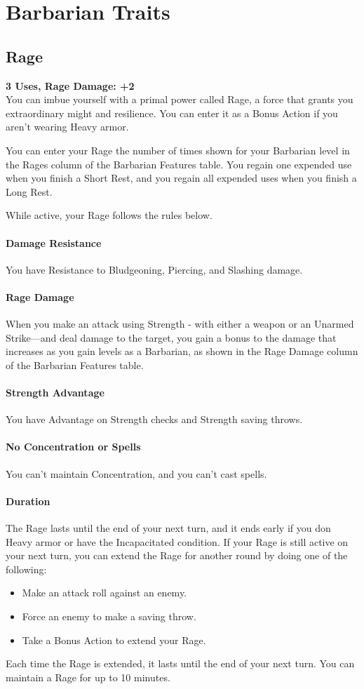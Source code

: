 \documentclass[letterpaper,openany,oneside,twocolumn]{book}
\begin{document}
\section*{Barbarian Traits}
\subsection*{Rage}
\newcommand{\RageModifier}{+2}\textbf{3 Uses, Rage Damage: \RageModifier}\\
You can imbue yourself with a primal power called Rage, a force that grants you extraordinary might and resilience. You can enter it as a Bonus Action if you aren't wearing Heavy armor.

You can enter your Rage the number of times shown for your Barbarian level in the Rages column of the Barbarian Features table. You regain one expended use when you finish a Short Rest, and you regain all expended uses when you finish a Long Rest.

While active, your Rage follows the rules below.

\paragraph*{Damage Resistance} You have Resistance to Bludgeoning, Piercing, and Slashing damage.

\paragraph*{Rage Damage} When you make an attack using Strength - with either a weapon or an Unarmed Strike—and deal damage to the target, you gain a bonus to the damage that increases as you gain levels as a Barbarian, as shown in the Rage Damage column of the Barbarian Features table.

\paragraph*{Strength Advantage} You have Advantage on Strength checks and Strength saving throws.

\paragraph*{No Concentration or Spells} You can't maintain Concentration, and you can't cast spells.

\paragraph*{Duration} The Rage lasts until the end of your next turn, and it ends early if you don Heavy armor or have the Incapacitated condition. If your Rage is still active on your next turn, you can extend the Rage for another round by doing one of the following:
\begin{itemize}
	\item Make an attack roll against an enemy.
	\item Force an enemy to make a saving throw.
	\item Take a Bonus Action to extend your Rage.
\end{itemize}
Each time the Rage is extended, it lasts until the end of your next turn. You can maintain a Rage for up to 10 minutes.
\end{document}
